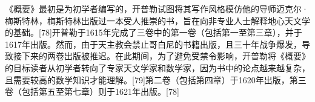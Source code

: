 《概要》最初是为初学者编写的，开普勒试图将其写作风格模仿他的导师迈克尔·梅斯特林，梅斯特林出版过一本受人推崇的书，旨在向非专业人士解释地心天文学的基础。[78]开普勒于1615年完成了三卷中的第一卷（包括第一至第三章），并于1617年出版。然而，由于天主教会禁止哥白尼的书籍出版，且三十年战争爆发，导致接下来的两卷出版被推迟。在此期间，为了避免受禁令影响，开普勒将《概要》的目标读者从初学者转向了专家天文学家和数学家，因为书中的论点越来越复杂，且需要较高的数学知识才能理解。[79]第二卷（包括第四章）于1620年出版，第三卷（包括第五至第七章）则于1621年出版。[78]